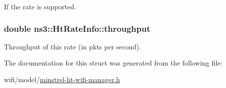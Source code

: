 If the rate is supported. 

\subsubsection[{\texorpdfstring{throughput}{throughput}}]{\setlength{\rightskip}{0pt plus 5cm}double ns3\+::\+Ht\+Rate\+Info\+::throughput}\hypertarget{structns3_1_1HtRateInfo_aad70746f027b325a5af640a6befb56a8}{}\label{structns3_1_1HtRateInfo_aad70746f027b325a5af640a6befb56a8}


Throughput of this rate (in pkts per second). 



The documentation for this struct was generated from the following file\+:\begin{DoxyCompactItemize}
\item 
wifi/model/\hyperlink{minstrel-ht-wifi-manager_8h}{minstrel-\/ht-\/wifi-\/manager.\+h}\end{DoxyCompactItemize}
